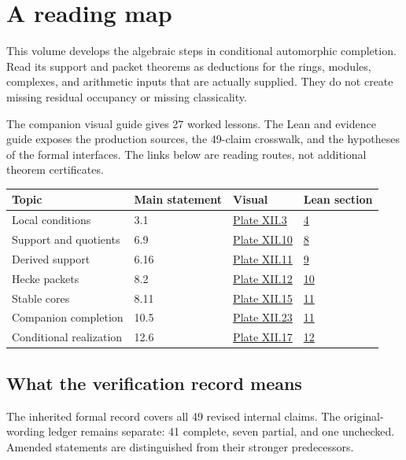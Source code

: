 \section*{A reading map}
This volume develops the algebraic steps in conditional automorphic completion. Read its support and packet theorems as deductions for the rings, modules, complexes, and arithmetic inputs that are actually supplied. They do not create missing residual occupancy or missing classicality.

The companion visual guide gives 27 worked lessons. The Lean and evidence guide exposes the production sources, the 49-claim crosswalk, and the hypotheses of the formal interfaces. The links below are reading routes, not additional theorem certificates.

\begin{center}\begin{tabular}{>{\raggedright\arraybackslash}p{.30\linewidth}lll}\toprule
Topic & Main statement & Visual & Lean section\\\midrule
Local conditions & 3.1 & \href{p12-route:main-v-3}{Plate XII.3} & \href{p12-route:main-l-3.1}{4}\\
Support and quotients & 6.9 & \href{p12-route:main-v-10}{Plate XII.10} & \href{p12-route:main-l-6.9}{8}\\
Derived support & 6.16 & \href{p12-route:main-v-11}{Plate XII.11} & \href{p12-route:main-l-6.16}{9}\\
Hecke packets & 8.2 & \href{p12-route:main-v-12}{Plate XII.12} & \href{p12-route:main-l-8.2}{10}\\
Stable cores & 8.11 & \href{p12-route:main-v-15}{Plate XII.15} & \href{p12-route:main-l-8.11}{11}\\
Companion completion & 10.5 & \href{p12-route:main-v-23}{Plate XII.23} & \href{p12-route:main-l-10.5}{11}\\
Conditional realization & 12.6 & \href{p12-route:main-v-17}{Plate XII.17} & \href{p12-route:main-l-12.6}{12}\\
\bottomrule\end{tabular}\end{center}
\subsection*{What the verification record means}
The inherited formal record covers all 49 revised internal claims. The original-wording ledger remains separate: 41 complete, seven partial, and one unchecked. Amended statements are distinguished from their stronger predecessors.

